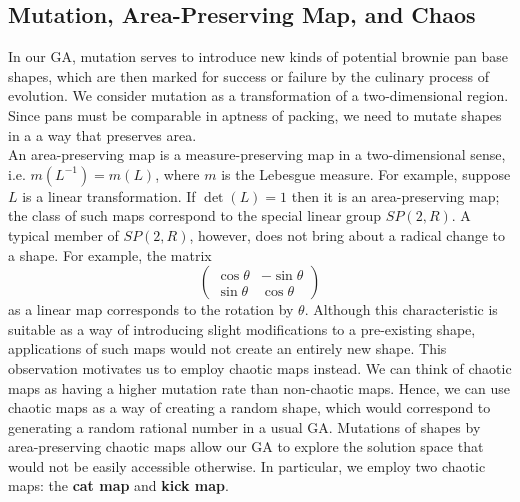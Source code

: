 \documentclass[12pt]{reedmcm}
\begin{document}
\subsection{Mutation, Area-Preserving Map, and Chaos}
In our GA, mutation serves to introduce new kinds of potential brownie pan base shapes, which are then marked for success or failure by the culinary process of evolution.
We consider mutation as a transformation of a two-dimensional region.
Since pans must be comparable in aptness of packing, we need to mutate shapes in a a way that preserves area.\\
An area-preserving map is a measure-preserving map in a two-dimensional sense, i.e. $m(L^{-1}) = m(L)$, where $m$ is the Lebesgue measure.
For example, suppose $L$ is a linear transformation.
If $\det(L) = 1$ then it is an area-preserving map; the class of such maps correspond to the special linear group $SP(2,R)$.
A typical member of $SP(2,R)$, however, does not bring about a radical change to a shape.
For example, the matrix
\begin{equation*}
\begin{pmatrix}
    \cos\theta & -\sin\theta  \\
    \sin\theta & \cos\theta  
  \end{pmatrix}
\end{equation*}
as a linear map corresponds to the rotation by $\theta$. 
Although this characteristic is suitable as a way of introducing slight modifications to a pre-existing shape, applications of such maps would not create an entirely new shape.
This observation motivates us to employ chaotic maps instead.
We can think of chaotic maps as having a higher mutation rate than non-chaotic maps.
Hence, we can use chaotic maps as a way of creating a random shape, which would correspond to generating a random rational number in a usual GA.
Mutations of shapes by area-preserving chaotic maps allow our GA to explore the solution space that would not be easily accessible otherwise.
In particular, we employ two chaotic maps: the \textbf{cat map} and \textbf{kick map}.
\end{document}

